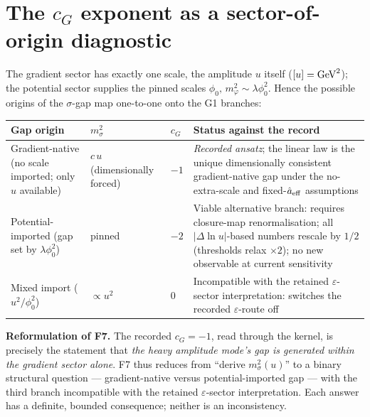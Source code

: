 \documentclass[11pt,a4paper]{article}
\begin{document}
\section{The $c_G$ exponent as a sector-of-origin diagnostic}
The gradient sector has exactly one scale, the amplitude $u$ itself
($[u]={\rm GeV}^2$); the potential sector supplies the pinned scales
$\phi_0,\,m_\varphi^2\sim\lambda\phi_0^2$. Hence the possible origins of the
$\sigma$-gap map one-to-one onto the G1 branches:
\renewcommand{\arraystretch}{1.2}\small
\begin{longtable}{@{}p{4.3cm}p{2.6cm}p{1.5cm}p{4.6cm}@{}}
\toprule \textbf{Gap origin} & $m_\sigma^2$ & $c_G$ & \textbf{Status against
the record} \\ \midrule \endhead \bottomrule \endfoot
Gradient-native (no scale imported; only $u$ available) & $c\,u$
(dimensionally forced) & $-1$ & \emph{Recorded ansatz}; the linear law is the
unique dimensionally consistent gradient-native gap under the no-extra-scale
and fixed-$\hat a_{\rm eff}$ assumptions \\
Potential-imported (gap set by $\lambda\phi_0^2$) & pinned & $-2$ & Viable
alternative branch: requires closure-map renormalisation; all
$|\Delta\ln u|$-based numbers rescale by $1/2$ (thresholds relax
$\times2$); no new observable at current sensitivity \\
Mixed import ($u^2/\phi_0^2$) & $\propto u^2$ & $0$ & Incompatible with the
retained $\varepsilon$-sector interpretation: switches the recorded
$\varepsilon$-route off \\
\end{longtable}\normalsize
\textbf{Reformulation of F7.} The recorded $c_G=-1$, read through the kernel,
is precisely the statement that \emph{the heavy amplitude mode's gap is
generated within the gradient sector alone}. F7 thus reduces from ``derive
$m_\sigma^2(u)$'' to a binary structural question --- gradient-native versus
potential-imported gap --- with the third branch incompatible with the
retained $\varepsilon$-sector interpretation. Each answer has a definite,
bounded consequence; neither is an inconsistency.
\end{document}
